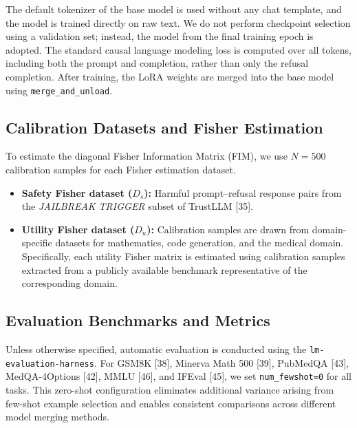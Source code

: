 \documentclass{article}
\begin{document}
\begin{itemize}
The default tokenizer of the base model is used without any chat template, and the model is trained directly on raw text. We do not perform checkpoint selection using a validation set; instead, the model from the final training epoch is adopted. The standard causal language modeling loss is computed over all tokens, including both the prompt and completion, rather than only the refusal completion. After training, the LoRA weights are merged into the base model using \texttt{merge\_and\_unload}.

\end{itemize}

\subsection{Calibration Datasets and Fisher Estimation}
\label{app:calibration_datasets}

To estimate the diagonal Fisher Information Matrix (FIM), we use $N=500$ calibration samples for each Fisher estimation dataset.

\begin{itemize}

\item \textbf{Safety Fisher dataset ($D_s$):}
Harmful prompt--refusal response pairs from the \textit{JAILBREAK TRIGGER} subset of TrustLLM [35].

\item \textbf{Utility Fisher dataset ($D_u$):}
Calibration samples are drawn from domain-specific datasets for mathematics, code generation, and the medical domain. Specifically, each utility Fisher matrix is estimated using calibration samples extracted from a publicly available benchmark representative of the corresponding domain.

\end{itemize}

\subsection{Evaluation Benchmarks and Metrics}
\label{app:evaluation_benchmarks}

Unless otherwise specified, automatic evaluation is conducted using the \texttt{lm-evaluation-harness}. For GSM8K [38], Minerva Math 500 [39], PubMedQA [43], MedQA-4Options [42], MMLU [46], and IFEval [45], we set \texttt{num\_fewshot=0} for all tasks. This zero-shot configuration eliminates additional variance arising from few-shot example selection and enables consistent comparisons across different model merging methods.
\end{document}

